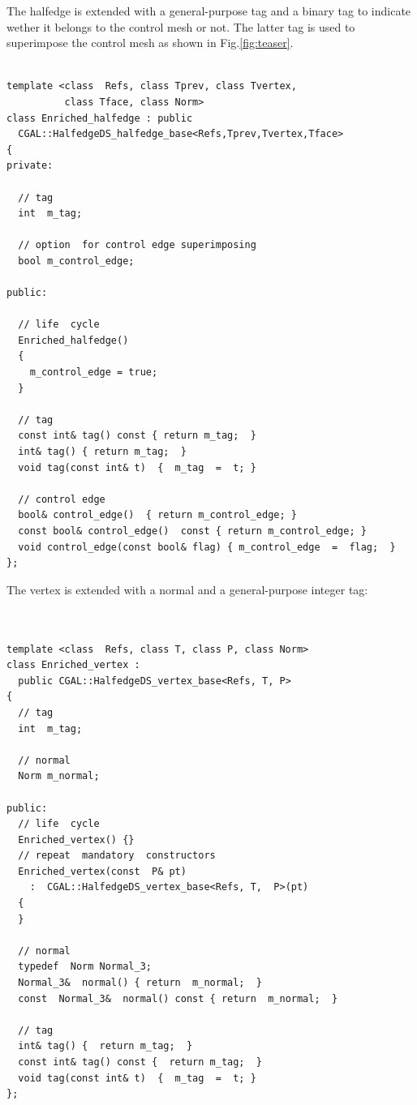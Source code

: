 The halfedge is extended with a general-purpose tag and a binary tag
to indicate wether it belongs to the control mesh or not. The latter
tag is used to superimpose the control mesh as shown in
Fig.\ref{fig:teaser}.

{ \scriptsize
\begin{verbatim}

template <class  Refs, class Tprev, class Tvertex, 
          class Tface, class Norm>
class Enriched_halfedge : public 
  CGAL::HalfedgeDS_halfedge_base<Refs,Tprev,Tvertex,Tface>
{
private:

  // tag
  int  m_tag; 

  // option  for control edge superimposing
  bool m_control_edge; 

public:

  // life  cycle
  Enriched_halfedge()
  {
    m_control_edge = true;
  }

  // tag
  const int& tag() const { return m_tag;  }
  int& tag() { return m_tag;  }
  void tag(const int& t)  {  m_tag  =  t; }

  // control edge  
  bool& control_edge()  { return m_control_edge; }
  const bool& control_edge()  const { return m_control_edge; }
  void control_edge(const bool& flag) { m_control_edge  =  flag;  }
};

\end{verbatim}}

The vertex is extended with a normal and a general-purpose integer
tag:

{ \scriptsize
\begin{verbatim}


template <class  Refs, class T, class P, class Norm>
class Enriched_vertex :  
  public CGAL::HalfedgeDS_vertex_base<Refs, T, P>
{
  // tag
  int  m_tag; 

  // normal
  Norm m_normal;

public:
  // life  cycle
  Enriched_vertex() {}
  // repeat  mandatory  constructors
  Enriched_vertex(const  P& pt)
    :  CGAL::HalfedgeDS_vertex_base<Refs, T,  P>(pt)
  {
  }

  // normal
  typedef  Norm Normal_3;
  Normal_3&  normal() { return  m_normal;  }
  const  Normal_3&  normal() const { return  m_normal;  }

  // tag
  int& tag() {  return m_tag;  }
  const int& tag() const {  return m_tag;  }
  void tag(const int& t)  {  m_tag  =  t; }
};

\end{verbatim}}



